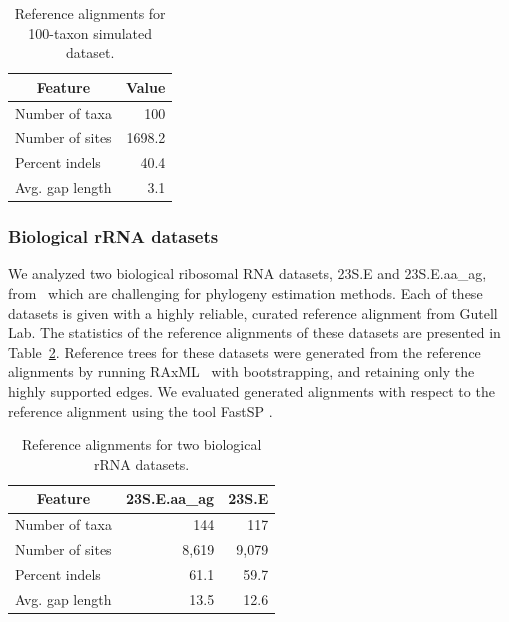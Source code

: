 \begin{table}[htbp]
	\centering
	\caption{Reference alignments for 100-taxon simulated dataset.}
	\begin{tabular}{|l|r|}
		\hline
		\multicolumn{1}{|c|}{Feature} & \multicolumn{1}{c|}{Value} \\
		\hline
		Number of taxa & 100 \\
		\hline
		Number of sites & 1698.2 \\
		\hline
		Percent indels & 40.4 \\
		\hline
		Avg. gap length & 3.1 \\
		\hline
	\end{tabular}%
	\label{tab:sim_stat}%
\end{table}%


\subsubsection{Biological rRNA datasets}
We analyzed two biological ribosomal RNA datasets, 23S.E and 23S.E.aa\_ag, from~\citealp{liu2009rapid} which are challenging for phylogeny estimation methods. Each of these datasets is given with a highly reliable, curated reference alignment from Gutell Lab. The statistics of the reference alignments of these datasets are presented in Table~\ref{tab:bio_stat}. Reference trees for these datasets were generated from the reference alignments by running RAxML~\citep{stamatakis2014raxml} with bootstrapping, and retaining only the highly supported edges. We evaluated generated alignments with respect to the reference alignment using the tool FastSP \citep{mirarab2011fastsp}.
\begin{table}[htbp]
	\small
	\centering
	\caption{Reference alignments for two biological rRNA datasets.}
	\begin{tabular}{|l|r|r|}
		\hline
		\multicolumn{1}{|c|}{Feature} & \multicolumn{1}{c|}{23S.E.aa\_ag} & \multicolumn{1}{c|}{23S.E} \\
		\hline
		Number of taxa & 144   & 117 \\
		\hline
		Number of sites & 8,619 & 9,079 \\
		\hline
		Percent indels & 61.1  & 59.7 \\
		\hline
		Avg. gap length & 13.5  & 12.6 \\
		\hline
	\end{tabular}%
	\label{tab:bio_stat}%
\end{table}%

